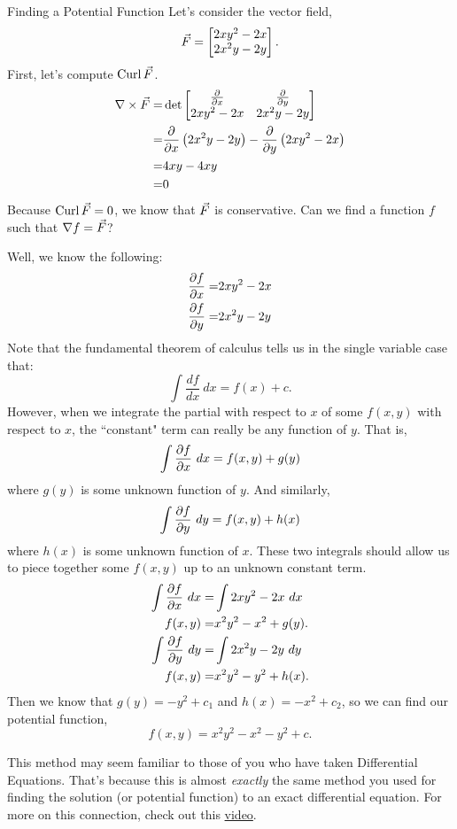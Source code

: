 \begin{example}{Finding a Potential Function}
Let's consider the vector field, $$\vec{F}=\begin{bmatrix}2xy^2-2x\\2x^2y-2y\end{bmatrix}. $$
First, let's compute $\operatorname{Curl}\vec{F}$. 
\begin{align*}
\nabla\times\vec{F}=&\det\begin{bmatrix}\frac{\partial }{\partial x}& \frac{\partial }{\partial y}\\2xy^2-2x&2x^2y-2y\end{bmatrix}\\
=&\frac{\partial }{\partial x}\left(2x^2y-2y\right)-\frac{\partial }{\partial y}\left(2xy^2-2x\right)\\
=&4xy-4xy\\
=&0
\end{align*}
Because $\operatorname{Curl}\vec{F}=0$, we know that $\vec{F}$ is conservative. Can we find a function $f$ such that $\nabla f=\vec{F}$?

\vspace{1em}

Well, we know the following:
\begin{align*}
\frac{\partial f}{\partial x}=&2xy^2-2x\\
\frac{\partial f}{\partial y}=&2x^2y-2y
\end{align*}
Note that the fundamental theorem of calculus tells us in the single variable case that: $$\int \frac{df}{dx}\ dx=f(x)+c. $$ However, when we integrate the partial with respect to $x$ of some $f(x,y)$ with respect to $x$, the ``constant" term can really be any function of $y$. That is, $$\int \delx{f} \ dx=f(x,y)+g(y) $$ where $g(y)$ is some unknown function of $y$. And similarly, $$\int\dely{f}\ dy=f(x,y)+h(x) $$ where $h(x)$ is some unknown function of $x$. These two integrals should allow us to piece together some $f(x,y)$ up to an unknown constant term.
\begin{align*}
\int\frac{\partial f}{\partial x}\ dx=&\int2xy^2-2x\ dx\\
f(x,y)=&x^2y^2-x^2+g(y).\\
\int\frac{\partial f}{\partial y}\ dy=&\int2x^2y-2y\ dy\\
f(x,y)=&x^2y^2-y^2+h(x).
\end{align*}
Then we know that $g(y)=-y^2+c_1$ and $h(x)=-x^2+c_2$, so we can find our potential function, $$f(x,y)=x^2y^2-x^2-y^2+c.$$
\end{example}

This method may seem familiar to those of you who have taken Differential Equations. That's because this is almost \textit{exactly} the same method you used for finding the solution (or potential function) to an exact differential equation. For more on this connection, check out this \href{https://youtu.be/cBoF59YyH3Q}{video}.

